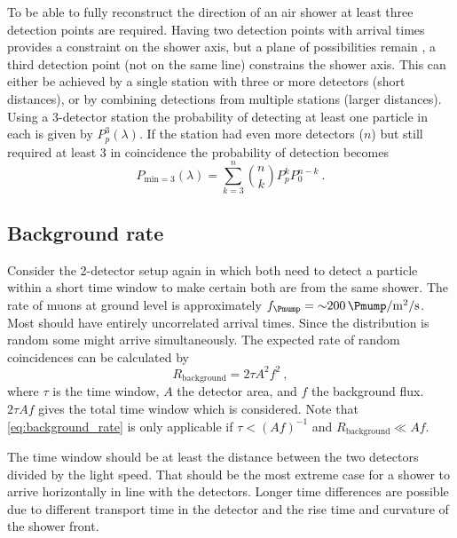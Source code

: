 To be able to fully reconstruct the direction of an air shower at least three detection points are required. Having two detection points with arrival times provides a constraint on the shower axis, but a plane of possibilities remain \cite{schultheiss2016pair}, a third detection point (not on the same line) constrains the shower axis. This can either be achieved by a single station with three or more detectors (short distances), or by combining detections from multiple stations (larger distances). Using a 3-detector station the probability of detecting at least one particle in each is given by $P_p^3(\lambda)$. If the station had even more detectors ($n$) but still required at least 3 in coincidence the probability of detection becomes
%
\begin{equation}
    P_{\mathrm{min}=3}(\lambda) = \sum_{k=3}^{n} \binom{n}{k} P_p^k P_0^{n-k} \ .
\end{equation}

\subsection{Background rate}

Consider the 2-detector setup again in which both need to detect a particle within a short time window to make certain both are from the same shower. The rate of muons at ground level is approximately $f_{\Pmump} = \SI{~200}{\Pmump\per\meter\squared\per\second}$. Most should have entirely uncorrelated arrival times. Since the distribution is random some might arrive simultaneously. The expected rate of random coincidences can be calculated by
%
\begin{equation}
    \label{eq:background_rate}
    R_{\mathrm{background}} = 2 \tau A^2 f^2 \ ,
\end{equation}
%
where $\tau$ is the time window, $A$ the detector area, and $f$ the background flux. $2 \tau A f$ gives the total time window which is considered. Note that \cref{eq:background_rate} is only applicable if $\tau < (A f)^{-1}$ and $R_{\mathrm{background}} \ll Af$.

The time window should be at least the distance between the two detectors divided by the light speed. That should be the most extreme case for a shower to arrive horizontally in line with the detectors. Longer time differences are possible due to different transport time in the detector and the rise time and curvature of the shower front.

